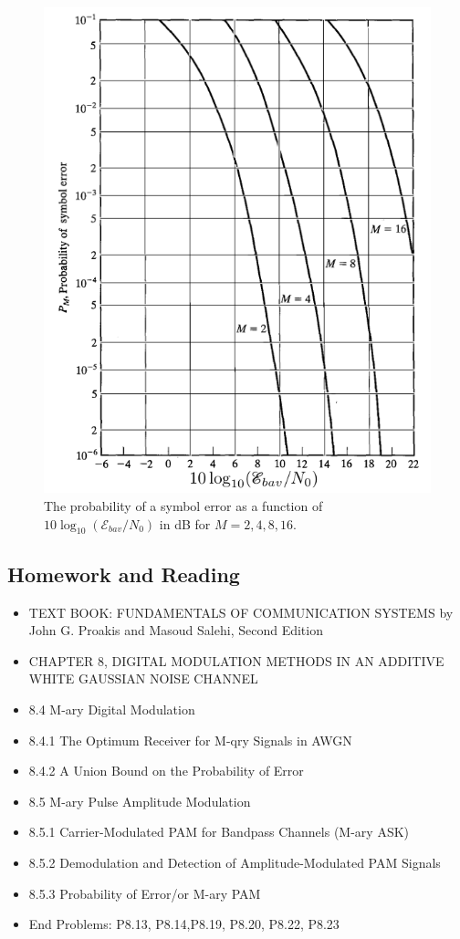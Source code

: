 \documentclass[a4paper]{article}
\numberwithin{equation}{subsection}
\begin{document}
	\begin{figure}
		\centering
		\includegraphics[width=.7\linewidth]{../figures/fig8_46}
		\caption{The probability of a symbol error as a function of $10\log_{10}(\mathcal{E}_{bav}/N_0)$ in dB for $M=2,4,8,16$.}
		\label{fig:fig846}
	\end{figure}
	
	\subsection{Homework and Reading}



	\begin{itemize}
		\item TEXT BOOK: FUNDAMENTALS OF COMMUNICATION SYSTEMS by John G. Proakis and 		Masoud Salehi, Second Edition
\item CHAPTER 8, DIGITAL MODULATION METHODS IN AN ADDITIVE WHITE GAUSSIAN NOISE CHANNEL
\item 8.4 M-ary Digital Modulation 
\item 8.4.1 The Optimum Receiver for M-qry Signals in AWGN
\item 8.4.2 A Union Bound on the Probability of Error
\item 8.5 M-ary Pulse Amplitude Modulation
\item 8.5.1 Carrier-Modulated PAM for Bandpass Channels (M-ary ASK)
\item 8.5.2 Demodulation and Detection of Amplitude-Modulated PAM Signals
\item 8.5.3 Probability of Error/or M-ary PAM
		\item End Problems: P8.13, P8.14,P8.19, P8.20, P8.22, P8.23
	\end{itemize}
\end{document}
